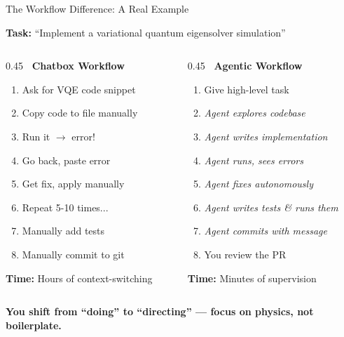 \documentclass[aspectratio=169]{beamer}
\begin{document}
\begin{frame}{The Workflow Difference: A Real Example}

\textbf{Task:} ``Implement a variational quantum eigensolver simulation''

\vspace{0.3cm}

\begin{columns}[T]
\begin{column}{0.45\textwidth}
\textcolor{claudeOrange}{\textbf{\faComments\ Chatbox Workflow}}
\begin{enumerate}
    \item Ask for VQE code snippet
    \item Copy code to file manually
    \item Run it $\rightarrow$ error!
    \item Go back, paste error
    \item Get fix, apply manually
    \item Repeat 5-10 times...
    \item Manually add tests
    \item Manually commit to git
\end{enumerate}
\textbf{Time:} Hours of context-switching
\end{column}

\begin{column}{0.45\textwidth}
\textcolor{quantumBlue}{\textbf{\faTerminal\ Agentic Workflow}}
\begin{enumerate}
    \item Give high-level task
    \item \textit{Agent explores codebase}
    \item \textit{Agent writes implementation}
    \item \textit{Agent runs, sees errors}
    \item \textit{Agent fixes autonomously}
    \item \textit{Agent writes tests \& runs them}
    \item \textit{Agent commits with message}
    \item You review the PR
\end{enumerate}
\textbf{Time:} Minutes of supervision
\end{column}
\end{columns}

\vspace{0.3cm}
\begin{center}
\colorbox{quantumBlue!20}{\parbox{0.8\textwidth}{\centering
\textbf{You shift from ``doing'' to ``directing'' --- focus on physics, not boilerplate.}
}}
\end{center}

\end{frame}
\end{document}
